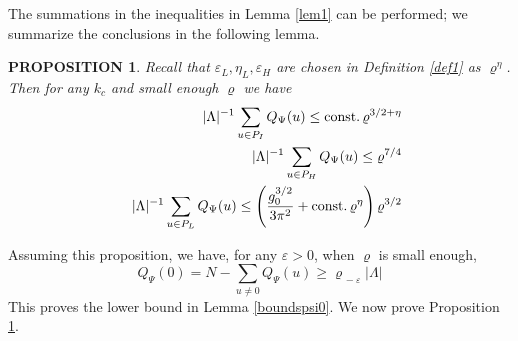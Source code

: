\documentclass[11pt]{article}
\numberwithin{equation}{section}
\newcommand{\e}{\varepsilon}
\newcommand{\beq}{\begin{equation}}
\newcommand{\eeq}{\end{equation}}
\newcommand{\beqa}{\begin{eqnarray}}
\newcommand{\eeqa}{\end{eqnarray}}
\newcommand\eps{\varepsilon}
\newcommand\rhom{\rho_{\,-\eps}}
\newcommand\const{{\rm const.\, }}
\renewcommand\rho\varrho
\newtheorem{prop}{PROPOSITION}[section]
\theoremstyle{definition}
\begin{document}
 

The summations in the inequalities in Lemma \ref{lem1} can be performed; 
we summarize the conclusions in the following lemma. 

\begin{prop}\label{particlebound} %
Recall that $\e_L, \eta_L, \e_H$ are chosen in Definition \ref{def1}
as $\rho^\eta$. Then for any $k_c$ and  small enough $\rho$ we have  
\beqa\label{temp4.17}
&&|\Lambda|^{-1}\sum_{u\in P_I} Q_\Psi(u)  \leq \const\rho^{3/2+\eta}
\\
&&|\Lambda|^{-1}\sum_{u\in P_H} Q_\Psi(u)\leq \rho^{7/4} \label{4.18}
\\
&&|\Lambda|^{-1}\sum_{u\in P_L} Q_\Psi(u) \leq \left(\frac{g_0^{3/2}}{3\pi^2}+\const\rho^\eta\right)\rho^{3/2}
\label{4.19}
\eeqa
\end{prop} 



Assuming this proposition, we have, for any $\eps>0$, when $\rho$ is small enough, 
\beq\label{resultlbpsi0}
Q_\Psi(0)=N-\sum_{u\neq 0} Q_\Psi(u)
\geq \rhom |\Lambda|
\eeq
 This  proves the lower bound in Lemma \ref{boundspsi0}.  We now prove Proposition \ref{particlebound}.
\end{document}
